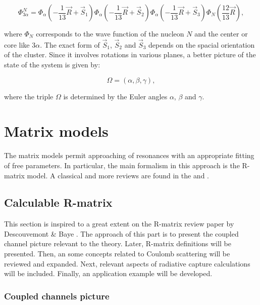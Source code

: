 \documentclass[openany]{book}
\begin{document}
\begin{equation} 	\label{eq:micro_multicluster_abc}
	\Phi^{N}_{3\alpha} = \Phi_\alpha \left (-\frac{1}{13} \vec R + \vec S_1 \right )  \Phi_\alpha \left (-\frac{1}{13} \vec R + \vec S_2 \right )  \Phi_\alpha \left (-\frac{1}{13} \vec R + \vec S_3 \right )  \Phi_N \left( \frac{12}{13} \vec R \right),
\end{equation}

where $\Phi_N$ corresponds to the wave function of the nucleon $N$ and the center or core like $3\alpha$. The exact form of $\vec S_1$, $\vec S_2$ and $\vec S_3$ depends on the spacial orientation of the cluster. Since it involves rotations in various planes, a better picture of the state of the system is given by:

\begin{equation} 	\label{eq:micro_multicluster_eulerAlgles}
	\Omega = (\alpha, \beta, \gamma),
\end{equation}

where the triple $\Omega$ is determined by the Euler angles $\alpha$, $\beta$ and $\gamma$. \\

\section{Matrix models}  \label{sec:matrixModels}

The matrix models permit approaching of resonances with an appropriate fitting of free parameters. In particular, the main formalism in this approach is the R-matrix model. A classical and more reviews are found in the  \cite{lane_thomas_1958} and \cite{descouvemont_baye_2010}. \\

\subsection{Calculable R-matrix} \label{sub:rmatrix_calculable}

This section is inspired to a great extent on the R-matrix review paper by Descouvemont \& Baye \cite{descouvemont_baye_2010}. The approach of this part is to present the coupled channel picture relevant to the theory. Later, R-matrix definitions will be presented. Then, an some concepts related to Coulomb scattering will be reviewed and expanded. Next, relevant aspects of radiative capture calculations will be included. Finally, an application example will be developed.

\subsubsection{Coupled channels picture} \label{ssub:rmatrix_calculable_coupled_channels}
\end{document}
